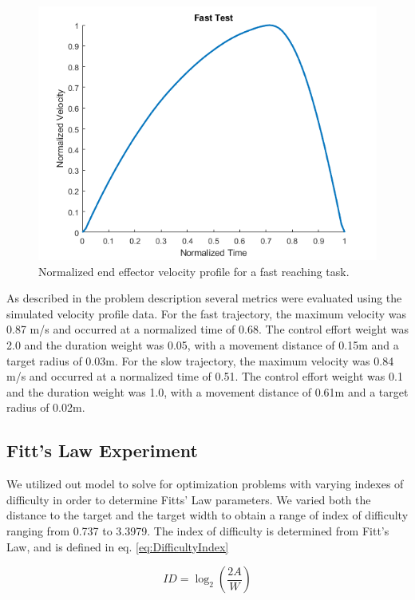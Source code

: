 \documentclass[letterpaper, 10pt, conference]{ieeeconf}
\begin{document}
\begin{figure}[h]
    \centering
    \includegraphics[width=1\linewidth]{Normalized Velocity Fast.png}
    \caption{Normalized end effector velocity profile for a fast reaching task.}
    \label{fig:VelocityFast}
\end{figure}

As described in the problem description several metrics were evaluated using the simulated velocity profile data. For the fast trajectory, the maximum velocity was 0.87 m/s and occurred at a normalized time of 0.68. The control effort weight was 2.0 and the duration weight was 0.05, with a movement distance of 0.15m and a target radius of 0.03m. For the slow trajectory, the maximum velocity was 0.84 m/s and occurred at a normalized time of 0.51. The control effort weight was 0.1 and the duration weight was 1.0, with a movement distance of 0.61m and a target radius of 0.02m. 

\subsection{Fitt's Law Experiment}

We utilized out model to solve for optimization problems with varying indexes of difficulty in order to determine Fitts' Law parameters. We varied both the distance to the target and the target width to obtain a range of index of difficulty ranging from 0.737 to 3.3979. The index of difficulty is determined from Fitt's Law, and is defined in eq. \ref{eq:DifficultyIndex}

\begin{equation}
    ID = \log_2 \left(\frac{2A}{W}\right) \label{eq:DifficultyIndex}
\end{equation}
\end{document}
